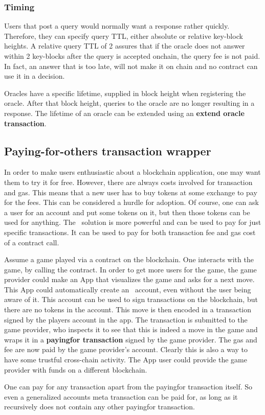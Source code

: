 \subsubsection{Timing}

Users that post a query would normally want a response rather
quickly. Therefore, they can specify query TTL, either absolute
or relative key-block heights. A relative query TTL of 2 assures
that if the oracle does not answer within 2 key-blocks after the query
is accepted onchain, the query fee is not paid. In fact, an answer that is too
late, will not make it on chain and no contract can use it in a
decision.

Oracles have a specific lifetime, supplied in block height when
registering the oracle. After that block height, queries to the oracle
are no longer resulting in a response. The lifetime of an oracle can
be extended using an \textbf{extend oracle transaction}.







\subsection{Paying-for-others transaction wrapper}
\label{sect:payingfor}

In order to make users enthusiastic about a blockchain application,
one may want them to try it for free. However, there are always costs
involved for transaction and gas. This means that a new user has to
buy tokens at some exchange to pay for the fees. This can be considered
a hurdle for adoption. Of course, one can ask a user for an account and put
some tokens on it, but then those tokens can be used for anything.
The \aet\ solution is more powerful and can be used to pay for
just specific transactions. It can be used to pay for both transaction
fee and gas cost of a contract call.

Assume a game played via a contract on the blockchain. One interacts
with the game, by calling the contract. In order to get more users for
the game, the game provider could make an App that visualizes
the game and asks for a next move. This App could automatically create
an \aet\ account, even without the user being aware of it. This
account can be used to sign transactions on the blockchain, but there
are no tokens in the account. This move is then encoded in a
transaction signed by the players account in the app. The transaction
is submitted to the game provider, who inspects it to see that this
is indeed a move in the game and wraps it in a \textbf{payingfor
  transaction} signed by the game provider. The gas and fee are now
paid by the game provider's account.
Clearly this is also a way to have some trustful cross-chain
activity. The App user could provide the game provider with funds on a
different blockchain.

One can pay for any transaction apart from the payingfor transaction
itself. So even a generalized accounts meta transaction can be paid
for, as long as it recursively does not contain any other payingfor
transaction.
